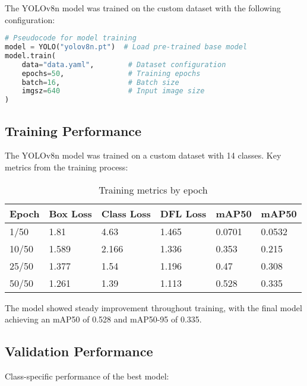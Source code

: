 \documentclass[9pt,a4paper,twoside]{rho-class/rho}
\begin{document}
    The YOLOv8n model was trained on the custom dataset with the following configuration:
    \newpage
    \begin{lstlisting}[caption=Pseudocode for model training, language=Python]
# Pseudocode for model training
model = YOLO("yolov8n.pt")  # Load pre-trained base model
model.train(
    data="data.yaml",        # Dataset configuration
    epochs=50,               # Training epochs
    batch=16,                # Batch size
    imgsz=640                # Input image size
)
    \end{lstlisting}
    
    \subsection{Training Performance}
    
    The YOLOv8n model was trained on a custom dataset with 14 classes. Key metrics from the training process:

    \begin{table}[h]
    \raggedright  %
    \caption{Training metrics by epoch}
    \label{tab:training}
    \begin{tabular}{llllll}
        \toprule
        \textbf{Epoch} & \textbf{Box Loss} & \textbf{Class Loss} & \textbf{DFL Loss} & \textbf{mAP50} & \textbf{mAP50} \\
        \midrule
        1/50  & 1.81  & 4.63  & 1.465 & 0.0701 & 0.0532 \\
        10/50 & 1.589 & 2.166 & 1.336 & 0.353  & 0.215  \\
        25/50 & 1.377 & 1.54  & 1.196 & 0.47   & 0.308  \\
        50/50 & 1.261 & 1.39  & 1.113 & 0.528  & 0.335  \\
        \bottomrule
    \end{tabular}
\end{table}
    
    The model showed steady improvement throughout training, with the final model achieving an mAP50 of 0.528 and mAP50-95 of 0.335.
    
    \subsection{Validation Performance}
    
    Class-specific performance of the best model:
    
\end{document}
